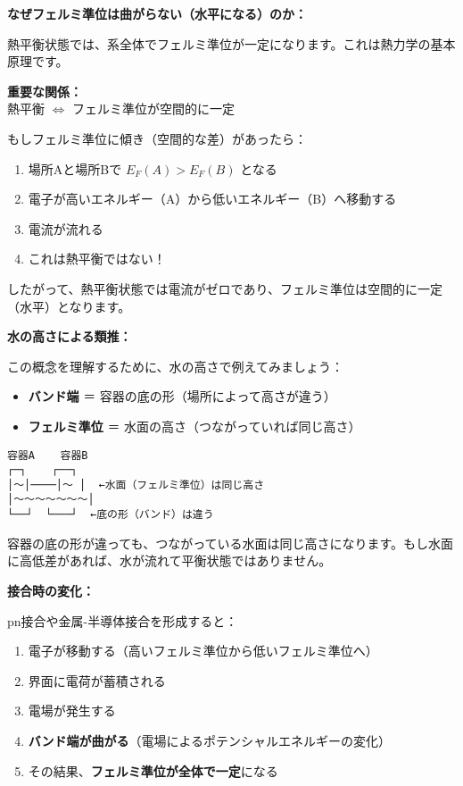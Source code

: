 \textbf{なぜフェルミ準位は曲がらない（水平になる）のか：}

熱平衡状態では、系全体でフェルミ準位が一定になります。これは熱力学の基本原理です。

\begin{screen}
\textbf{重要な関係：}\\
熱平衡 $\Leftrightarrow$ フェルミ準位が空間的に一定
\end{screen}

もしフェルミ準位に傾き（空間的な差）があったら：

\begin{enumerate}
\item 場所Aと場所Bで $E_F(A) > E_F(B)$ となる
\item 電子が高いエネルギー（A）から低いエネルギー（B）へ移動する
\item 電流が流れる
\item これは熱平衡ではない！
\end{enumerate}

したがって、熱平衡状態では電流がゼロであり、フェルミ準位は空間的に一定（水平）となります。

\textbf{水の高さによる類推：}

この概念を理解するために、水の高さで例えてみましょう：

\begin{itemize}
\item \textbf{バンド端} ＝ 容器の底の形（場所によって高さが違う）
\item \textbf{フェルミ準位} ＝ 水面の高さ（つながっていれば同じ高さ）
\end{itemize}

\begin{verbatim}
容器A    容器B
┌─┐    ┌──┐
│～│────│～ │  ←水面（フェルミ準位）は同じ高さ
│～～～～～～～│
└──┘  └───┘  ←底の形（バンド）は違う
\end{verbatim}

容器の底の形が違っても、つながっている水面は同じ高さになります。もし水面に高低差があれば、水が流れて平衡状態ではありません。

\textbf{接合時の変化：}

pn接合や金属-半導体接合を形成すると：

\begin{enumerate}
\item 電子が移動する（高いフェルミ準位から低いフェルミ準位へ）
\item 界面に電荷が蓄積される
\item 電場が発生する
\item \textbf{バンド端が曲がる}（電場によるポテンシャルエネルギーの変化）
\item その結果、\textbf{フェルミ準位が全体で一定}になる
\end{enumerate}

